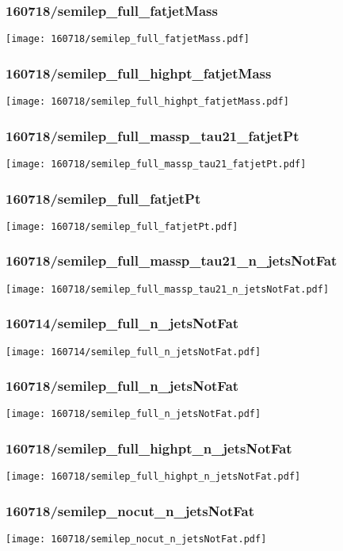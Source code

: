 \begin{frame}
   \frametitle{\small 160718/semilep\_full\_fatjetMass}
   \centering
   \texttt{[image: 160718/semilep\_full\_fatjetMass.pdf]}
\end{frame}

\begin{frame}
   \frametitle{\small 160718/semilep\_full\_highpt\_fatjetMass}
   \centering
   \texttt{[image: 160718/semilep\_full\_highpt\_fatjetMass.pdf]}
\end{frame}

\begin{frame}
   \frametitle{\small 160718/semilep\_full\_massp\_tau21\_fatjetPt}
   \centering
   \texttt{[image: 160718/semilep\_full\_massp\_tau21\_fatjetPt.pdf]}
\end{frame}

\begin{frame}
   \frametitle{\small 160718/semilep\_full\_fatjetPt}
   \centering
   \texttt{[image: 160718/semilep\_full\_fatjetPt.pdf]}
\end{frame}

\begin{frame}
   \frametitle{\small 160718/semilep\_full\_massp\_tau21\_n\_jetsNotFat}
   \centering
   \texttt{[image: 160718/semilep\_full\_massp\_tau21\_n\_jetsNotFat.pdf]}
\end{frame}

\begin{frame}
   \frametitle{\small 160714/semilep\_full\_n\_jetsNotFat}
   \centering
   \texttt{[image: 160714/semilep\_full\_n\_jetsNotFat.pdf]}
\end{frame}

\begin{frame}
   \frametitle{\small 160718/semilep\_full\_n\_jetsNotFat}
   \centering
   \texttt{[image: 160718/semilep\_full\_n\_jetsNotFat.pdf]}
\end{frame}

\begin{frame}
   \frametitle{\small 160718/semilep\_full\_highpt\_n\_jetsNotFat}
   \centering
   \texttt{[image: 160718/semilep\_full\_highpt\_n\_jetsNotFat.pdf]}
\end{frame}

\begin{frame}
   \frametitle{\small 160718/semilep\_nocut\_n\_jetsNotFat}
   \centering
   \texttt{[image: 160718/semilep\_nocut\_n\_jetsNotFat.pdf]}
\end{frame}

